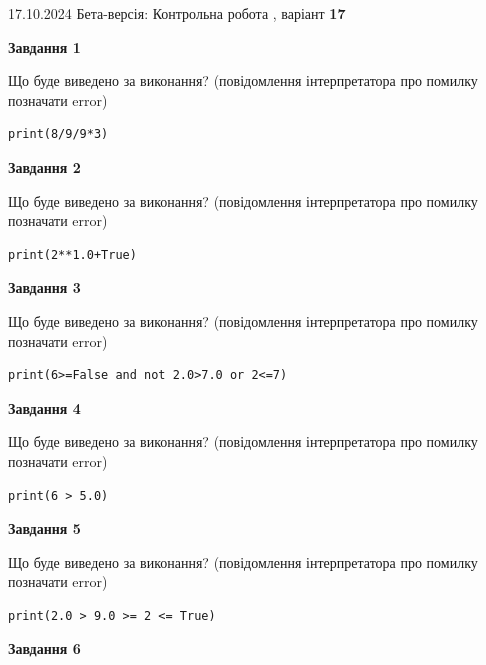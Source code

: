 \documentclass[12pt, ukrainian]{article}
\begin{document}
{\Large{17.10.2024 Бета-версія: Контрольна робота , варіант  \No \textbf { 17 }\par}}
{
\begin {large}
{\begin {center}\textbf{Завдання 1}\end {center}}

Що буде виведено за виконання? (повідомлення інтерпретатора про помилку позначати error)\par
\begin{verbatim}
print(8/9/9*3)
\end{verbatim}

{\begin {center}\textbf{Завдання 2}\end {center}}

Що буде виведено за виконання? (повідомлення інтерпретатора про помилку позначати error)\par
\begin{verbatim}
print(2**1.0+True)
\end{verbatim}

{\begin {center}\textbf{Завдання 3}\end {center}}

Що буде виведено за виконання? (повідомлення інтерпретатора про помилку позначати error)\par
\begin{verbatim}
print(6>=False and not 2.0>7.0 or 2<=7)
\end{verbatim}

{\begin {center}\textbf{Завдання 4}\end {center}}

Що буде виведено за виконання? (повідомлення інтерпретатора про помилку позначати error)\par
\begin{verbatim}
print(6 > 5.0)
\end{verbatim}

{\begin {center}\textbf{Завдання 5}\end {center}}

Що буде виведено за виконання? (повідомлення інтерпретатора про помилку позначати error)\par
\begin{verbatim}
print(2.0 > 9.0 >= 2 <= True)
\end{verbatim}

{\begin {center}\textbf{Завдання 6}\end {center}}


\end{large}}
\end{document}
